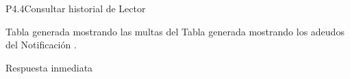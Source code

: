 \begin{Proceso}{P4.4}{Consultar historial de Lector}
   { %
    \begin{UClist}
      \UCli Tabla generada mostrando las multas del 
      \UCli Tabla generada mostrando los adeudos del 
      \UCli Notificación .
    \end{UClist}
  }

   { %
  }

   { %
    \begin{UClist}
      \UCli Respuesta inmediata 
    \end{UClist}
  }
   { %
  }


\end{Proceso}

